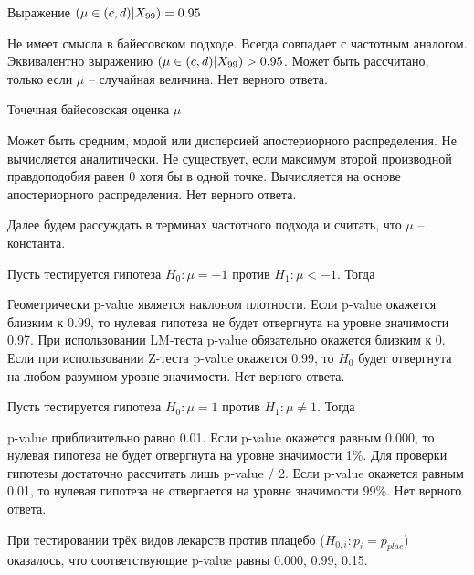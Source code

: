\documentclass[10pt, a4paper]{exam}
\let\P\relax
\DeclareMathOperator{\P}{\mathbb{P}}
\begin{document}
\begin{questions}
		\question Выражение $\P(\mu \in (c, d) | X_{99}) = 0.95$
		\begin{choices}
			\choice Не имеет смысла в байесовском подходе.
			\choice Всегда совпадает с частотным аналогом.
			\choice Эквивалентно выражению $\P(\mu \in (c, d) | X_{99}) > 0.95$.
			\choice Может быть рассчитано, только если $\mu$ -- случайная величина.
			\choice Нет верного ответа.
		\end{choices}
	
		\question Точечная байесовская оценка $\mu$
		\begin{choices}
			\choice Может быть средним, модой или дисперсией апостериорного распределения.
			\choice Не вычисляется аналитически.
			\choice Не существует, если максимум второй производной правдоподобия равен 0 хотя бы в одной точке.
			\choice Вычисляется на основе апостериорного распределения.
			\choice Нет верного ответа.
		\end{choices}
		\vspace{1em}
	
		Далее будем рассуждать в терминах частотного подхода и считать, что $\mu$ -- константа.
		\vspace{1em}
		
		\question Пусть тестируется гипотеза $H_0: \mu = -1$ против $H_1: \mu < -1$. Тогда
		\begin{choices}
			\choice Геометрически p-value является наклоном плотности.
			\choice Если p-value окажется близким к 0.99, то нулевая гипотеза не будет отвергнута на уровне значимости 0.97.
			\choice При использовании LM-теста p-value обязательно окажется близким к 0.
			\choice Если при использовании Z-теста p-value окажется 0.99, то $H_0$ будет отвергнута на любом разумном уровне значимости.
			\choice Нет верного ответа.
		\end{choices}
	
		\question Пусть тестируется гипотеза $H_0: \mu = 1$ против $H_1: \mu \ne 1$. Тогда
		\begin{choices}
			\choice p-value приблизительно равно 0.01.
			\choice Если p-value окажется равным 0.000, то нулевая гипотеза не будет отвергнута на уровне значимости 1\%.
			\choice Для проверки гипотезы достаточно рассчитать лишь p-value / 2.
			\choice Если p-value окажется равным 0.01, то нулевая гипотеза не отвергается на уровне значимости 99\%.
			\choice Нет верного ответа.
		\end{choices}
	\end{questions}
	
	При тестировании трёх видов лекарств против плацебо ($H_{0,i}: p_i = p_{plac}$) оказалось, что соответствующие p-value равны 0.000, 0.99, 0.15.
	
\end{document}
